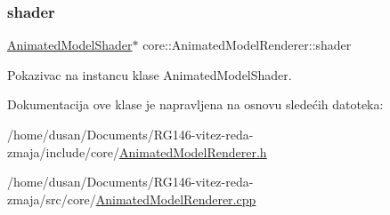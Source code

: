 \subsubsection{\texorpdfstring{shader}{shader}}
{\footnotesize\ttfamily \hyperlink{classshader_1_1AnimatedModelShader}{Animated\+Model\+Shader}$\ast$ core\+::\+Animated\+Model\+Renderer\+::shader\hspace{0.3cm}{\ttfamily [private]}}



Pokazivac na instancu klase Animated\+Model\+Shader. 



Dokumentacija ove klase je napravljena na osnovu sledećih datoteka\+:\begin{DoxyCompactItemize}
\item 
/home/dusan/\+Documents/\+R\+G146-\/vitez-\/reda-\/zmaja/include/core/\hyperlink{AnimatedModelRenderer_8h}{Animated\+Model\+Renderer.\+h}\item 
/home/dusan/\+Documents/\+R\+G146-\/vitez-\/reda-\/zmaja/src/core/\hyperlink{AnimatedModelRenderer_8cpp}{Animated\+Model\+Renderer.\+cpp}\end{DoxyCompactItemize}
